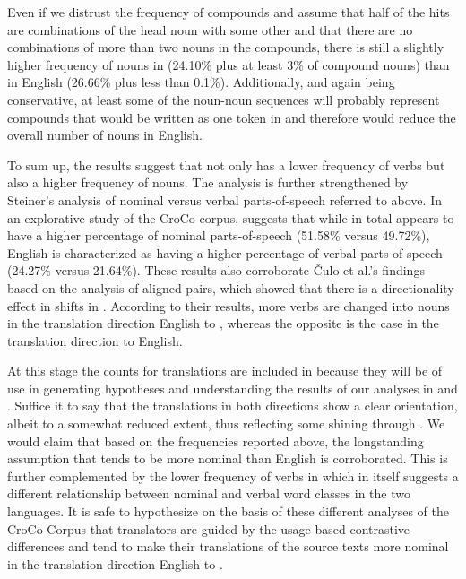 \documentclass[output=paper]{LSP/langsci}
\begin{document}
Even if we distrust the frequency of compounds and assume that half of the hits are combinations of the head noun with some other  and that there are no combinations of more than two nouns in the compounds, there is still a slightly higher frequency of nouns in  (24.10\% plus at least 3\% of compound nouns) than in English (26.66\% plus less than 0.1\%). Additionally, and again being conservative, at least some of the noun-noun sequences will probably represent compounds that would be written as one token in  and therefore would reduce the overall number of nouns in English. 

To sum up, the results suggest that  not only has a lower frequency of verbs but also a higher frequency of nouns. The analysis is further strengthened by Steiner's analysis of nominal versus verbal parts-of-speech referred to above. In an explorative study of the CroCo corpus, \citet[80]{Steiner2012} suggests that while  in total appears to have a higher percentage of nominal parts-of-speech (51.58\% versus 49.72\%), English is characterized as having a higher percentage of verbal parts-of-speech (24.27\% versus 21.64\%). These results also corroborate Čulo et al.'s \citeyearpar{Culo2008} findings based on the analysis of aligned pairs, which showed that there is a directionality effect in shifts in . According to their results, more verbs are changed into nouns in the translation direction English to , whereas the opposite is the case in the translation direction  to English. 

At this stage the counts for translations are included in  because they will be of use in generating hypotheses and understanding the results of our analyses in  and . Suffice it to say that the translations in both directions show a clear  orientation, albeit to a somewhat reduced extent, thus reflecting some  shining through \citep{Teich2003}. We would claim that based on the frequencies reported above, the longstanding assumption that  tends to be more nominal than English is corroborated. This is further complemented by the lower frequency of verbs in  which in itself suggests a different relationship between nominal and verbal word classes in the two languages. It is safe to hypothesize on the basis of these different analyses of the CroCo Corpus that translators are guided by the usage-based contrastive differences and tend to make their translations of the source texts more nominal in the translation direction English to .
\end{document}

